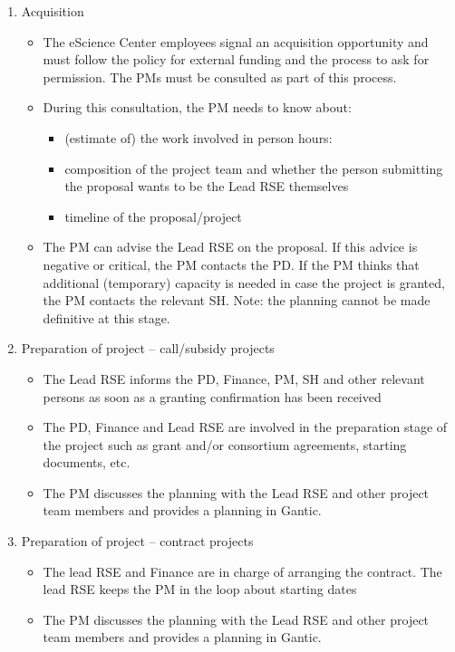 \begin{enumerate}[label=\arabic*.,ref=\arabic*]
\item Acquisition
\begin{itemize}
\item The eScience Center employees signal an acquisition opportunity and must follow the policy for
external funding and the process to ask for permission. The PMs must be consulted as part of this process.
\item During this consultation, the PM needs to know about:
\begin{itemize}
\item (estimate of) the work involved in person hours:
\item composition of the project team and whether the person submitting the proposal wants to be the Lead RSE themselves
\item timeline of the proposal/project
\end{itemize}
\item The PM can advise the Lead RSE on the proposal. If this advice is negative or critical, the PM
contacts the PD. If the PM thinks that additional (temporary) capacity is needed in case the project is granted, the PM
contacts the relevant SH. Note: the planning cannot be made definitive at this stage.
\end{itemize}
\item Preparation of project – call/subsidy projects
\begin{itemize}
\item The Lead RSE informs the PD, Finance, PM, SH and other relevant persons as soon as a granting
confirmation has been received
\item The PD, Finance and Lead RSE are involved in the preparation stage of the project such as grant
and/or consortium agreements, starting documents, etc.
\item The PM discusses the planning with the Lead RSE and other project team members and provides a
planning in Gantic.
\end{itemize}
\item Preparation of project – contract projects
\begin{itemize}
\item The lead RSE and Finance are in charge of arranging the contract. The lead RSE keeps the PM in
the loop about starting dates
\item The PM discusses the planning with the Lead RSE and other project team members and provides a
planning in Gantic.

\end{itemize}
\end{enumerate}
